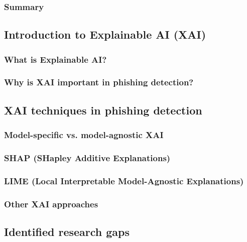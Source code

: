 \subsubsection*{Summary}

\newpage

\subsection*{Introduction to Explainable AI (XAI)}

\subsubsection*{What is Explainable AI?}

\subsubsection*{Why is XAI important in phishing detection?}

\newpage

\subsection*{XAI techniques in phishing detection}

\subsubsection*{Model-specific vs. model-agnostic XAI}

\subsubsection*{SHAP (SHapley Additive Explanations)}

\subsubsection*{LIME (Local Interpretable Model-Agnostic Explanations)}

\subsubsection*{Other XAI approaches}

\newpage

\subsection*{Identified research gaps}

